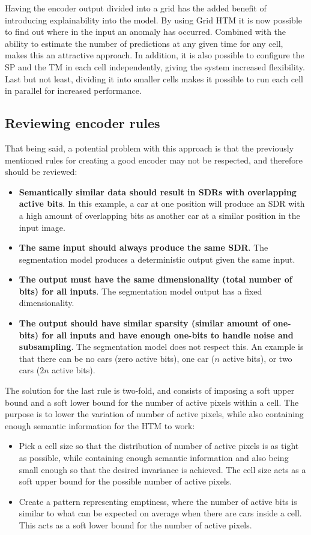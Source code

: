 Having the encoder output divided into a grid has the added benefit of introducing explainability into the model. By using Grid HTM it is now possible to find out where in the input an anomaly has occurred. Combined with the ability to estimate the number of predictions at any given time for any cell, makes this an attractive approach. In addition, it is also possible to configure the SP and the TM in each cell independently, giving the system increased flexibility. Last but not least, dividing it into smaller cells makes it possible to run each cell in parallel for increased performance.
\subsection{Reviewing encoder rules}
That being said, a potential problem with this approach is that the previously mentioned rules for creating a good encoder may not be respected, and therefore should be reviewed:
\begin{itemize}
    \item \textbf{Semantically similar data should result in SDRs with overlapping active bits}. In this example, a car at one position will produce an SDR with a high amount of overlapping bits as another car at a similar position in the input image.
    \item \textbf{The same input should always produce the same SDR}. The segmentation model produces a deterministic output given the same input.
    \item \textbf{The output must have the same dimensionality (total number of bits) for all inputs}. The segmentation model output has a fixed dimensionality.
    \item \textbf{The output should have similar sparsity (similar amount of one-bits) for all inputs and have enough one-bits to handle noise and subsampling}. The segmentation model does not respect this. An example is that there can be no cars (zero active bits), one car ($n$ active bits), or two cars ($2n$ active bits).
\end{itemize}
The solution for the last rule is two-fold, and  consists of imposing a soft upper bound and a soft lower bound for the number of active pixels within a cell. The purpose is to lower the variation of number of active pixels, while also containing enough semantic information for the HTM to work:
\begin{itemize}
    \item Pick a cell size so that the distribution of number of active pixels is as tight as possible, while containing enough semantic information and also being small enough so that the desired invariance is achieved. The cell size acts as a soft upper bound for the possible number of active pixels.
    \item Create a pattern representing emptiness, where the number of active bits is similar to what can be expected on average when there are cars inside a cell. This acts as a soft lower bound for the number of active pixels.
\end{itemize}
